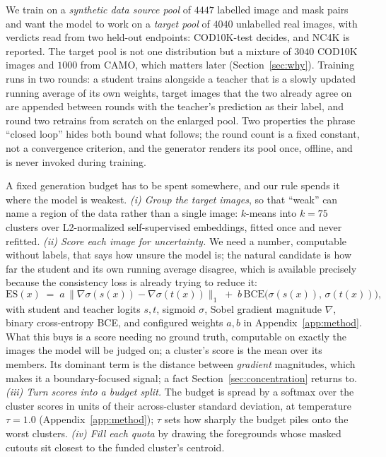 \documentclass{article}
\newcommand{\atemp}{\tau}
\begin{document}
We train on a \emph{synthetic data source pool} of $4447$ labelled image and mask pairs
and want the model to work on a \emph{target pool} of $4040$ unlabelled real images, with verdicts
read from two held-out endpoints: COD10K-test decides, and NC4K is reported. The target pool is not
one distribution but a mixture of $3040$ COD10K images and $1000$ from CAMO, which matters later
(Section~\ref{sec:why}). Training runs in two rounds: a student trains alongside a teacher that is a slowly updated running
average of its own weights, target images that the two already agree on are appended between rounds with
the teacher's prediction as their label, and round two retrains from scratch on the enlarged pool.
Two properties the phrase ``closed loop'' hides both bound what follows; the round count is a
fixed constant, not a convergence criterion, and the generator renders its pool once, offline, and
is never invoked during training.

A fixed generation budget has to be spent somewhere, and our rule spends it where the model is weakest. \textit{(i) Group the target images}, so that
``weak'' can name a region of the data rather than a single image: $k$-means into $k = 75$ clusters
over L2-normalized self-supervised embeddings, fitted once and never refitted. \textit{(ii) Score
each image for uncertainty.} We need a number, computable without labels, that says how unsure the model is; the natural candidate is how far the student and its own running average disagree, which
is available precisely because the consistency loss is already trying to reduce it:
\begin{equation}
\mathrm{ES}(x) \;=\; a \,\big\| \nabla \sigma(s(x)) - \nabla \sigma(t(x)) \big\|_{1}
\;+\; b \, \mathrm{BCE}\big( \sigma(s(x)),\, \sigma(t(x)) \big),
\label{eq:es}
\end{equation}
with student and teacher logits $s,t$, sigmoid $\sigma$, Sobel gradient magnitude $\nabla$, binary
cross-entropy BCE, and
configured weights $a, b$ in Appendix~\ref{app:method}. What this buys is a score needing no ground
truth, computable on exactly the images the model will be judged on; a cluster's score is the mean
over its members. Its dominant term is the distance between \emph{gradient} magnitudes, which makes it a boundary-focused signal; a fact Section~\ref{sec:concentration} returns to. \textit{(iii) Turn scores into a budget split.} The budget is spread by a softmax over the cluster scores in units of their across-cluster standard deviation, at temperature $\atemp = 1.0$ (Appendix~\ref{app:method}); $\atemp$ sets how sharply the
budget piles onto the worst clusters.
\textit{(iv) Fill each quota} by drawing the foregrounds whose masked cutouts sit closest to the
funded cluster's centroid.
\end{document}
